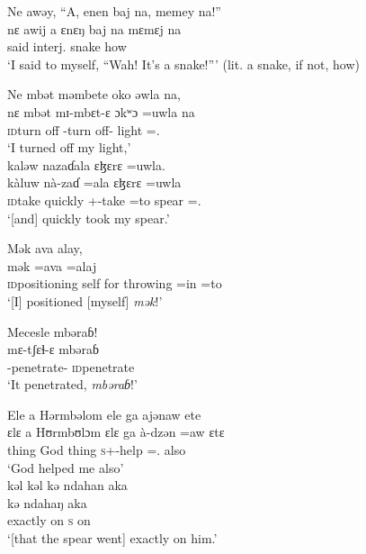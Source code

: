 \ea  Ne  awəy,    “A,  enen  baj  na,  memey  na!”\\
\gll nɛ awij    a          ɛnɛŋ       baj     na  mɛmɛj   na\\
{\oneS} said    interj.   snake  {\NEG}   {\PSP}  how       {\PSP}\\
\glt ‘I said to myself, “Wah! It’s a snake!”’ (lit. a snake, if not, how)
\z

\ea
 Ne  mbət  məmbete  oko  əwla  na,\\
\gll nɛ   mbət           mɪ-mbɛt-ɛ           ɔkʷɔ     =uwla        na\\
{\oneS}    {\textsc{id}turn off}  {\NOM}{}-{turn off}-{\CL}  light    ={\oneS}.{\POSS}  {\PSP} \\
\glt ‘I turned off my light,’\\

\medskip
 kaləw  nazaɗala  ɛɮɛrɛ  =uwla.\\
\gll kàluw               nà-zaɗ        =ala  ɛɮɛrɛ  =uwla\\
{\textsc{id}take quickly}  {\oneS}+{\PFV}-take =to spear     ={\oneS}.{\POSS} \\
\glt ‘[and] quickly took my spear.’
\z

\ea
 Mək  ava  alay,\\
\gll mək         =ava   =alaj\\
{\textsc{id}positioning self for throwing}   =in    =to\\
\glt ‘[I] positioned [myself] \textit{mək}!’
\z

\ea
 Mecesle  mbəraɓ! \\
\gll mɛ-tʃɛɬ-ɛ            mbəraɓ\\
{\NOM}{}-penetrate-{\CL}      \textsc{id}penetrate\\
\glt ‘It penetrated, \textit{mbəraɓ}!’
\z

\ea  
 {Ele  a}  Hərmbəlom  ele  ga  ajənaw  ete\\
\gll ɛlɛ     a        Hʊrmbʊlɔm  ɛlɛ     ga      à-dzən    =aw    ɛtɛ\\
thing   {\GEN}   God    thing  {\ADJ}   \textsc{s}+{\PFV}-help  ={\oneS}.{\IO}    also \\
\glt ‘God helped me also’\\

\medskip
 kəl kəl   kə ndahan aka\\
   kə ndahaŋ aka\\
exactly  on  \textsc{s}        on\\
\glt ‘[that the spear went] exactly on him.’
\z

